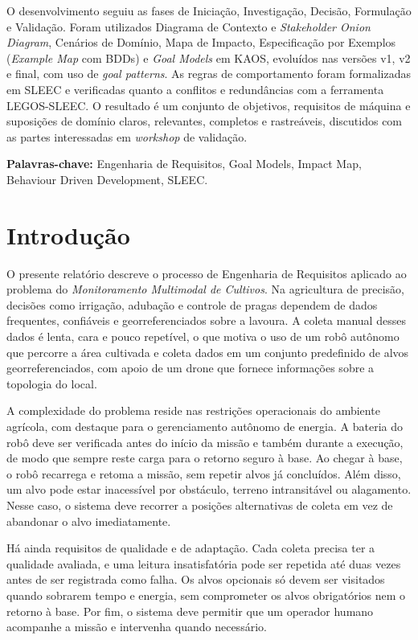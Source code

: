 \documentclass[a4paper, 12pt]{article}
\begin{document}
O desenvolvimento seguiu as fases de Iniciação, Investigação, Decisão, Formulação e Validação. Foram utilizados Diagrama de Contexto e \textit{Stakeholder Onion Diagram}, Cenários de Domínio, Mapa de Impacto, Especificação por Exemplos (\textit{Example Map} com BDDs) e \textit{Goal Models} em KAOS, evoluídos nas versões v1, v2 e final, com uso de \textit{goal patterns}. As regras de comportamento foram formalizadas em SLEEC e verificadas quanto a conflitos e redundâncias com a ferramenta LEGOS-SLEEC. O resultado é um conjunto de objetivos, requisitos de máquina e suposições de domínio claros, relevantes, completos e rastreáveis, discutidos com as partes interessadas em \textit{workshop} de validação.

\textbf{Palavras-chave:} Engenharia de Requisitos, Goal Models, Impact Map, Behaviour Driven Development, SLEEC.

\section{Introdução}

O presente relatório descreve o processo de Engenharia de Requisitos aplicado ao problema do \textit{Monitoramento Multimodal de Cultivos}. Na agricultura de precisão, decisões como irrigação, adubação e controle de pragas dependem de dados frequentes, confiáveis e georreferenciados sobre a lavoura. A coleta manual desses dados é lenta, cara e pouco repetível, o que motiva o uso de um robô autônomo que percorre a área cultivada e coleta dados em um conjunto predefinido de alvos georreferenciados, com apoio de um drone que fornece informações sobre a topologia do local.

A complexidade do problema reside nas restrições operacionais do ambiente agrícola, com destaque para o gerenciamento autônomo de energia. A bateria do robô deve ser verificada antes do início da missão e também durante a execução, de modo que sempre reste carga para o retorno seguro à base. Ao chegar à base, o robô recarrega e retoma a missão, sem repetir alvos já concluídos. Além disso, um alvo pode estar inacessível por obstáculo, terreno intransitável ou alagamento. Nesse caso, o sistema deve recorrer a posições alternativas de coleta em vez de abandonar o alvo imediatamente.

Há ainda requisitos de qualidade e de adaptação. Cada coleta precisa ter a qualidade avaliada, e uma leitura insatisfatória pode ser repetida até duas vezes antes de ser registrada como falha. Os alvos opcionais só devem ser visitados quando sobrarem tempo e energia, sem comprometer os alvos obrigatórios nem o retorno à base. Por fim, o sistema deve permitir que um operador humano acompanhe a missão e intervenha quando necessário.
\end{document}
